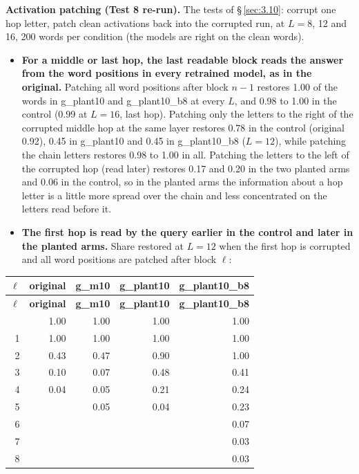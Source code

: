 \documentclass[paper=a4,fontsize=11pt,DIV=11,parskip=half,headings=small,numbers=noendperiod]{scrartcl}
\DeclareRobustCommand{\lead}[1]{\textsf{\bfseries\color{accent}#1}}
\DeclareRobustCommand{\code}[1]{{\fontseries{m}\ttfamily #1}}
\DeclareRobustCommand{\hdr}[1]{\textsf{\bfseries #1}}
\begin{document}
\lead{Activation patching (Test 8 re-run).} The tests of \S\,\ref{sec:3.10}: corrupt one hop letter, patch clean
activations back into the corrupted run, at $L=8$, 12 and 16, 200 words per condition (the models are right on
the clean words).

\begin{itemize}
\item \lead{For a middle or last hop, the last readable block reads the answer from the word positions in every
  retrained model, as in the original.} Patching all word positions after block $n-1$ restores 1.00 of the words
  in \code{g\_\allowbreak{}plant10} and \code{g\_\allowbreak{}plant10\_\allowbreak{}b8} at every $L$, and 0.98
  to 1.00 in the control (0.99 at $L=16$, last hop). Patching only the letters to the right of the corrupted
  middle hop at the same layer restores 0.78 in the control (original 0.92), 0.45 in
  \code{g\_\allowbreak{}plant10} and 0.45 in \code{g\_\allowbreak{}plant10\_\allowbreak{}b8} ($L=12$), while
  patching the chain letters restores 0.98 to 1.00 in all. Patching the letters to the left of the corrupted hop
  (read later) restores 0.17 and 0.20 in the two planted arms and 0.06 in the control, so in the planted arms
  the information about a hop letter is a little more spread over the chain and less concentrated on the letters
  read before it.
\item \lead{The first hop is read by the query earlier in the control and later in the planted arms.} Share
  restored at $L=12$ when the first hop is corrupted and all word positions are patched after block $\ell$:
\end{itemize}

{\small\nopagebreak[4]
\begin{longtable}{@{}r r r r r@{}}
\toprule
\hdr{$\ell$} & \hdr{original} & \hdr{\code{g\_\allowbreak{}m10}} & \hdr{\code{g\_\allowbreak{}plant10}} & \hdr{\code{g\_\allowbreak{}plant10\_\allowbreak{}b8}} \\
\midrule
\endfirsthead
\toprule
\hdr{$\ell$} & \hdr{original} & \hdr{\code{g\_\allowbreak{}m10}} & \hdr{\code{g\_\allowbreak{}plant10}} & \hdr{\code{g\_\allowbreak{}plant10\_\allowbreak{}b8}} \\
\midrule
\endhead
\bottomrule
\endlastfoot
0 & 1.00 & 1.00 & 1.00 & 1.00 \\
1 & 1.00 & 1.00 & 1.00 & 1.00 \\
2 & 0.43 & 0.47 & 0.90 & 1.00 \\
3 & 0.10 & 0.07 & 0.48 & 0.41 \\
4 & 0.04 & 0.05 & 0.21 & 0.24 \\
5 &  & 0.05 & 0.04 & 0.23 \\
6 &  &  &  & 0.07 \\
7 &  &  &  & 0.03 \\
8 &  &  &  & 0.03 \\
\end{longtable}}
\end{document}
